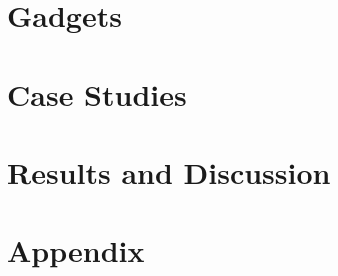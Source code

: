 \documentclass[sigconf]{acmart}
\begin{document}
\section{Gadgets}

%
\section{Case Studies}

%
\section{Results and Discussion}







\appendix
\section{Appendix}
\label{appendix:source-code-listings}

\end{document}
